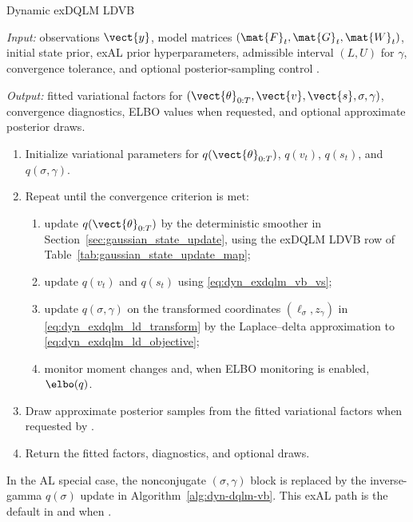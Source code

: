 \begin{suppalgorithm}{Dynamic exDQLM LDVB}
\label{alg:dyn-exdqlm-ldvb}
\par\noindent\emph{Input:} observations $\vect{y}$, model matrices
$(\mat{F}_t,\mat{G}_t,\mat{W}_t)$, initial state prior, exAL prior
hyperparameters, admissible interval $(L,U)$ for $\gamma$, convergence
tolerance, and optional posterior-sampling control .
\par\noindent\emph{Output:} fitted variational factors for
$(\vect{\theta}_{0:T},\vect{v},\vect{s},\sigma,\gamma)$, convergence
diagnostics, ELBO values when requested, and optional approximate posterior
draws.
\begin{enumerate}[label=(\arabic*)]
\item Initialize variational parameters for $q(\vect{\theta}_{0:T})$,
$q(v_t)$, $q(s_t)$, and $q(\sigma,\gamma)$.
\item Repeat until the convergence criterion is met:
  \begin{enumerate}[label=(\alph*)]
  \item update $q(\vect{\theta}_{0:T})$ by the deterministic smoother in
  Section~\ref{sec:gaussian_state_update}, using the exDQLM LDVB row of
  Table~\ref{tab:gaussian_state_update_map};
  \item update $q(v_t)$ and $q(s_t)$ using \eqref{eq:dyn_exdqlm_vb_vs};
  \item update $q(\sigma,\gamma)$ on the transformed coordinates
  $(\ell_\sigma,z_\gamma)$ in \eqref{eq:dyn_exdqlm_ld_transform} by the
  Laplace--delta approximation to \eqref{eq:dyn_exdqlm_ld_objective};
  \item monitor moment changes and, when ELBO monitoring is enabled, $\elbo(q)$.
  \end{enumerate}
\item Draw approximate posterior samples from the fitted variational factors
when requested by .
\item Return the fitted factors, diagnostics, and optional draws.
\end{enumerate}
\end{suppalgorithm}
In the AL special case, the nonconjugate $(\sigma,\gamma)$ block is replaced
by the inverse-gamma $q(\sigma)$ update in Algorithm~\ref{alg:dyn-dqlm-vb}.
This exAL path is the default in  and 
when .

